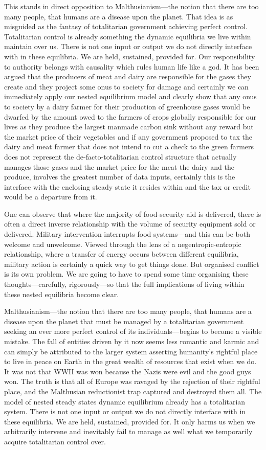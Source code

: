 This stands in direct opposition to Malthusianism—the notion that there are too many people, that humans are a disease upon the planet. That idea is as misguided as the fantasy of totalitarian government achieving perfect control. Totalitarian control is already something the dynamic equilibria we live within maintain over us. There is not one input or output we do not directly interface with in these equilibria. We are held, sustained, provided for. Our responsibility to authority belongs with causality which rules human life like a god. It has been argued that the producers of meat and dairy are responsible for the gases they create and they project some onus to society for damage and certainly we can immediately apply our nested equilibrium model and clearly show that any onus to society by a dairy farmer for their production of greenhouse gases would be dwarfed by the amount owed to the farmers of crops globally responsible for our lives as they produce the largest manmade carbon sink without any reward but the market price of their vegetables and if any government proposed to tax the dairy and meat farmer that does not intend to cut a check to the green farmers does not represent the de-facto-totalitarian control structure that actually manages those gases and the market price for the meat the dairy and the produce, involves the greatest number of data inputs, certainly this is the interface with the enclosing steady state it resides within and the tax or credit would be a departure from it.

One can observe that where the majority of food-security aid is delivered, there is often a direct inverse relationship with the volume of security equipment sold or delivered. Military intervention interrupts food systems—and this can be both welcome and unwelcome. Viewed through the lens of a negentropic-entropic relationship, where a transfer of energy occurs between different equilibria, military action is certainly a quick way to get things done. But organised conflict is its own problem. We are going to have to spend some time organising these thoughts—carefully, rigorously—so that the full implications of living within these nested equilibria become clear.

Malthusianism—the notion that there are too many people, that humans are a disease upon the planet that must be managed by a totalitarian government seeking an ever more perfect control of its individuals—begins to become a visible mistake. The fall of entities driven by it now seems less romantic and karmic and can simply be attributed to the larger system asserting humanity’s rightful place to live in peace on Earth in the great wealth of resources that exist when we do. It was not that WWII was won because the Nazis were evil and the good guys won. The truth is that all of Europe was ravaged by the rejection of their rightful place, and the Malthusian reductionist trap captured and destroyed them all. The model of nested steady states dynamic equilibrium already has a totalitarian system. There is not one input or output we do not directly interface with in these equilibria. We are held, sustained, provided for. It only harms us when we arbitrarily intervene and inevitably fail to manage as well what we temporarily acquire totalitarian control over.

